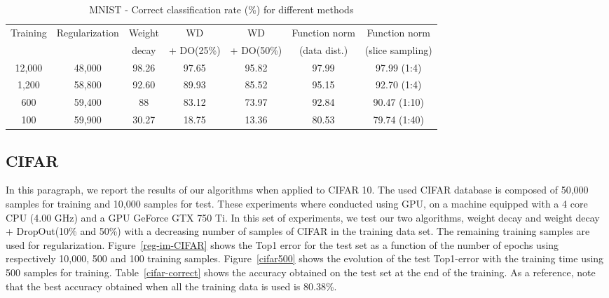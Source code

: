 \documentclass{article}
\begin{document}
\begin{table}[ht!]
\centering
\begin{tabular}{|c|c||c|c|c|c|c|}
\hline
Training & Regularization & Weight & WD &WD & Function norm  & Function norm\\
& & decay &  + DO(25\%)& + DO(50\%)  &(data dist.)&(slice sampling)\\
\hline
\hline
12,000 & 48,000 & 98.26 & 97.65 & 95.82 & 97.99 &  97.99 (1:4)\\
1,200 & 58,800 & 92.60 & 89.93 & 85.52 & 95.15 & 92.70 (1:4)\\
600 & 59,400 & 88 & 83.12 & 73.97 & 92.84 & 90.47 (1:10)\\
100 & 59,900 & 30.27 & 18.75 & 13.36 & 80.53 & 79.74 (1:40)\\
\hline
\end{tabular}
\caption{MNIST - Correct classification rate (\%) for different methods}
\label{mnist-correct}
\end{table}

\subsection{CIFAR}
In this paragraph, we report the results of our algorithms when applied to CIFAR 10. The used CIFAR database is composed of 50,000 samples for training and 10,000 samples for test. These experiments where conducted using GPU, on a machine equipped with a 4 core CPU (4.00 GHz) and a GPU GeForce GTX 750 Ti. In this set of experiments, we test our two algorithms, weight decay and weight decay + DropOut(10\% and 50\%) with a decreasing number of samples of CIFAR in the training data set. The remaining training samples are used for regularization. Figure~\ref{reg-im-CIFAR} shows the Top1 error for the test set as a function of the number of epochs using respectively 10,000, 500 and 100 training samples. Figure~\ref{cifar500} shows the evolution of the test Top1-error with the training time using 500 samples for training. Table~\ref{cifar-correct} shows the accuracy obtained on the test set at the end of the training. As a reference, note that the best accuracy obtained when all the training data is used is 80.38\%.
\end{document}
